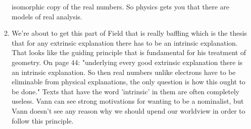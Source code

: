 \documentclass[12pt]{article}
\theoremstyle{definition}
\begin{document}
\begin{enumerate}
        isomorphic copy of the real numbers. So physics gets you that there are
        models of real analysis.
    \item
        We're about to get this part of Field that is really baffling which is
        the thesis that for any extrinsic explanation there has to be an
        intrinsic explanation. That looks like the guiding principle that is
        fundamental for his treatment of geometry. On page 44: "underlying
        every good extrinsic explanation there is an intrinsic explanation. So
        then real numbers unlike electrons have to be eliminable from physical
        explanations, the only question is how this ought to be done." Texts
        that have the word 'intrinsic' in them are often completely useless.
        Vann can see strong motivations for wanting to be a nominalist, but
        Vann doesn't see any reason why we should upend our worldview in order
        to follow this principle.

\end{enumerate}
\end{document}
